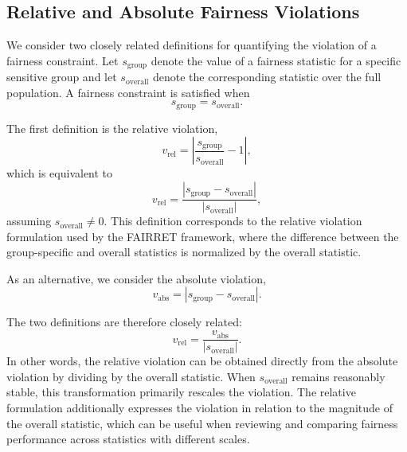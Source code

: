 \subsection{Relative and Absolute Fairness Violations}
\label{sec}

We consider two closely related definitions for quantifying the violation of a fairness constraint. Let $s_{\mathrm{group}}$ denote the value of a fairness statistic for a specific sensitive group and let $s_{\mathrm{overall}}$ denote the corresponding statistic over the full population. A fairness constraint is satisfied when
\begin{equation}
s_{\mathrm{group}} = s_{\mathrm{overall}}.
\end{equation}

The first definition is the relative violation,
\begin{equation}
v_{\mathrm{rel}}
=
\left|
\frac{s_{\mathrm{group}}}{s_{\mathrm{overall}}} - 1
\right|,
\label{eq}
\end{equation}
which is equivalent to
\begin{equation}
v_{\mathrm{rel}}
=
\frac{
\left|
s_{\mathrm{group}} - s_{\mathrm{overall}}
\right|
}{
\left|s_{\mathrm{overall}}\right|
},
\end{equation}
assuming $s_{\mathrm{overall}} \neq 0$. This definition corresponds to the relative violation formulation used by the FAIRRET framework, where the difference between the group-specific and overall statistics is normalized by the overall statistic.

As an alternative, we consider the absolute violation,
\begin{equation}
v_{\mathrm{abs}}
=
\left|
s_{\mathrm{group}} - s_{\mathrm{overall}}
\right|.
\label{eq}
\end{equation}

The two definitions are therefore closely related:
\begin{equation}
v_{\mathrm{rel}}
=
\frac{v_{\mathrm{abs}}}{\left|s_{\mathrm{overall}}\right|}.
\label{eq}
\end{equation}
In other words, the relative violation can be obtained directly from the absolute violation by dividing by the overall statistic. When $s_{\mathrm{overall}}$ remains reasonably stable, this transformation primarily rescales the violation. The relative formulation additionally expresses the violation in relation to the magnitude of the overall statistic, which can be useful when reviewing and comparing fairness performance across statistics with different scales.

